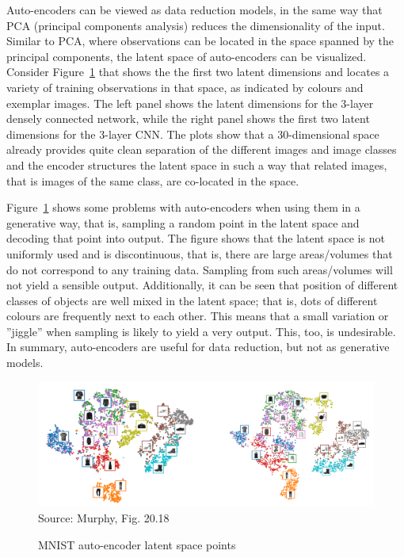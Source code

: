 Auto-encoders can be viewed as data reduction models, in the same way that PCA (principal components analysis) reduces the dimensionality of the input. Similar to PCA, where observations can be located in the space spanned by the principal components, the latent space of auto-encoders can be visualized. Consider Figure~\ref{fig:mnist_autoencoder_latent_space} that shows the the first two latent dimensions and locates a variety of training observations in that space, as indicated by colours and exemplar images. The left panel shows the latent dimensions for the 3-layer densely connected network, while the right panel shows the first two latent dimensions for the 3-layer CNN. The plots show that a 30-dimensional space already provides quite clean separation of the different images and image classes and the encoder structures the latent space in such a way that related images, that is images of the same class, are co-located in the space.

Figure~\ref{fig:mnist_autoencoder_latent_space} shows some problems with auto-encoders when using them in a generative way, that is, sampling a random point in the latent space and decoding that point into output. The figure shows that the latent space is not uniformly used and is discontinuous, that is, there are large areas/volumes that do not correspond to any training data. Sampling from such areas/volumes will not yield a sensible output. Additionally, it can be seen that position of different classes of objects are well mixed in the latent space; that is, dots of different colours are frequently next to each other. This means that a small variation or ''jiggle'' when sampling is likely to yield a very output. This, too, is undesirable. In summary, auto-encoders are useful for data reduction, but not as generative models.

\begin{figure}
\begin{center}
\includegraphics[width=\textwidth]{murphy_20_18.png} \\

\scriptsize Source: Murphy, Fig. 20.18 \normalsize
\end{center}
\caption{MNIST auto-encoder latent space points}
\label{fig:mnist_autoencoder_latent_space}
\end{figure}

